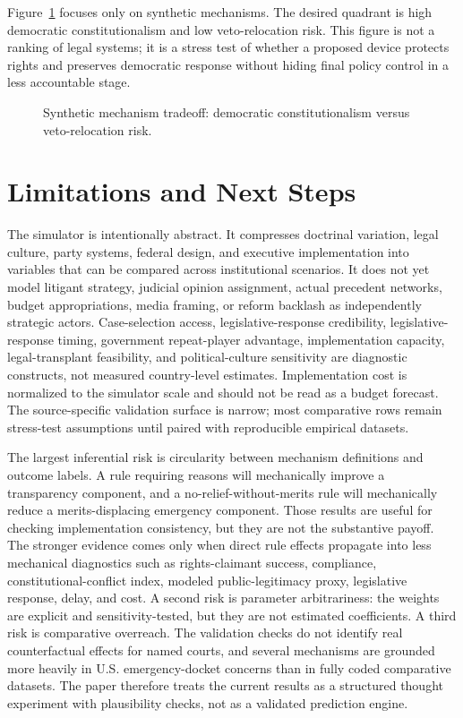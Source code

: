 \documentclass[
  journal=small,
  manuscript=research-article,
  year=2026
]{cup-journal}
\begin{document}
Figure~\ref{fig:mechanism-tradeoff} focuses only on synthetic mechanisms. The desired quadrant is high democratic constitutionalism and low veto-relocation risk. This figure is not a ranking of legal systems; it is a stress test of whether a proposed device protects rights and preserves democratic response without hiding final policy control in a less accountable stage.

\begin{figure}[t]
\centering

\caption{Synthetic mechanism tradeoff: democratic constitutionalism versus veto-relocation risk.}
\label{fig:mechanism-tradeoff}
\end{figure}

\section{Limitations and Next Steps}
\label{sec:limits}

The simulator is intentionally abstract. It compresses doctrinal variation, legal culture, party systems, federal design, and executive implementation into variables that can be compared across institutional scenarios. It does not yet model litigant strategy, judicial opinion assignment, actual precedent networks, budget appropriations, media framing, or reform backlash as independently strategic actors. Case-selection access, legislative-response credibility, legislative-response timing, government repeat-player advantage, implementation capacity, legal-transplant feasibility, and political-culture sensitivity are diagnostic constructs, not measured country-level estimates. Implementation cost is normalized to the simulator scale and should not be read as a budget forecast. The source-specific validation surface is narrow; most comparative rows remain stress-test assumptions until paired with reproducible empirical datasets.

The largest inferential risk is circularity between mechanism definitions and outcome labels. A rule requiring reasons will mechanically improve a transparency component, and a no-relief-without-merits rule will mechanically reduce a merits-displacing emergency component. Those results are useful for checking implementation consistency, but they are not the substantive payoff. The stronger evidence comes only when direct rule effects propagate into less mechanical diagnostics such as rights-claimant success, compliance, constitutional-conflict index, modeled public-legitimacy proxy, legislative response, delay, and cost. A second risk is parameter arbitrariness: the weights are explicit and sensitivity-tested, but they are not estimated coefficients. A third risk is comparative overreach. The validation checks do not identify real counterfactual effects for named courts, and several mechanisms are grounded more heavily in U.S. emergency-docket concerns than in fully coded comparative datasets. The paper therefore treats the current results as a structured thought experiment with plausibility checks, not as a validated prediction engine.
\end{document}
